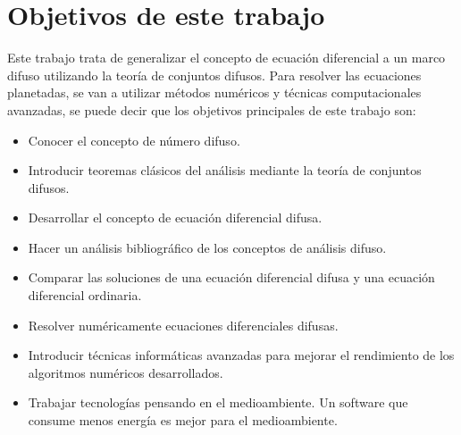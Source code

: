 \section{Objetivos de este trabajo}
Este trabajo trata de generalizar el concepto de ecuación diferencial a un marco difuso utilizando la teoría de conjuntos difusos. Para resolver las ecuaciones planetadas, se van a utilizar métodos numéricos y técnicas computacionales avanzadas, se puede decir que los objetivos principales de este trabajo son:
\begin{itemize}
	\item Conocer el concepto de número difuso.
	
	\item Introducir teoremas clásicos del análisis mediante la teoría de conjuntos difusos.
	
	\item Desarrollar el concepto de ecuación diferencial difusa.
	
	\item Hacer un análisis bibliográfico de los conceptos de análisis difuso.
	
	\item Comparar las soluciones de una ecuación diferencial difusa y una ecuación diferencial ordinaria.
	
	\item Resolver numéricamente ecuaciones diferenciales difusas.
	
	\item Introducir técnicas informáticas avanzadas para mejorar el rendimiento de los algoritmos numéricos desarrollados.
	
	\item Trabajar tecnologías pensando en el medioambiente. Un software que consume menos energía es mejor para el medioambiente.
\end{itemize}
